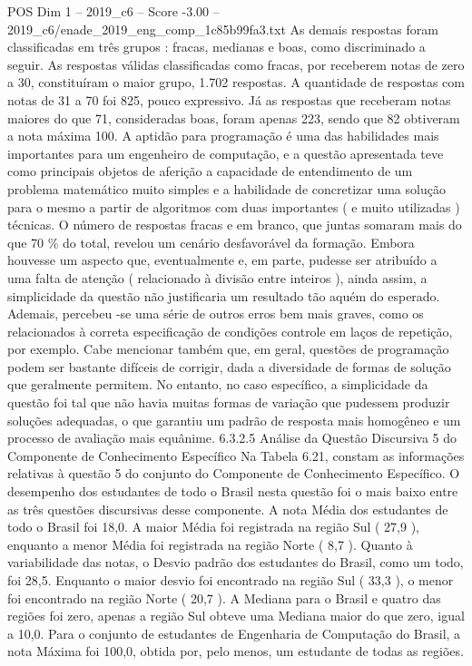 \begin{textsample}{POS Dim 1 – 2019\_c6 – Score -3.00 – 2019\_c6/enade\_2019\_eng\_comp\_1c85b99fa3.txt}
As demais respostas foram classificadas em três grupos : fracas, medianas e boas, como discriminado a seguir.
As respostas válidas classificadas como fracas, por receberem notas de zero a 30, constituíram o maior grupo, 1.702 respostas.
A quantidade de respostas com notas de 31 a 70 foi 825, pouco expressivo.
Já as respostas que receberam notas maiores do que 71, consideradas boas, foram apenas 223, sendo que 82 obtiveram a nota máxima 100.
A aptidão para programação é uma das habilidades mais importantes para um engenheiro de computação, e a questão apresentada teve como principais objetos de aferição a capacidade de entendimento de um problema matemático muito simples e a habilidade de concretizar uma solução para o mesmo a partir de algoritmos com duas importantes ( e muito utilizadas ) técnicas.
O número de respostas fracas e em branco, que juntas somaram mais do que 70 \% do total, revelou um cenário desfavorável da formação.
Embora houvesse um aspecto que, eventualmente e, em parte, pudesse ser atribuído a uma falta de atenção ( relacionado à divisão entre inteiros ), ainda assim, a simplicidade da questão não justificaria um resultado tão aquém do esperado.
Ademais, percebeu -se uma série de outros erros bem mais graves, como os relacionados à correta especificação de condições controle em laços de repetição, por exemplo.
Cabe mencionar também que, em geral, questões de programação podem ser bastante difíceis de corrigir, dada a diversidade de formas de solução que geralmente permitem.
No entanto, no caso específico, a simplicidade da questão foi tal que não havia muitas formas de variação que pudessem produzir soluções adequadas, o que garantiu um padrão de resposta mais homogêneo e um processo de avaliação mais equânime. 6.3.2.5 Análise da Questão Discursiva 5 do Componente de Conhecimento Específico Na Tabela 6.21, constam as informações relativas à questão 5 do conjunto do Componente de Conhecimento Específico.
O desempenho dos estudantes de todo o Brasil nesta questão foi o mais baixo entre as três questões discursivas desse componente.
A nota Média dos estudantes de todo o Brasil foi 18,0.
A maior Média foi registrada na região Sul ( 27,9 ), enquanto a menor Média foi registrada na região Norte ( 8,7 ).
Quanto à variabilidade das notas, o Desvio padrão dos estudantes do Brasil, como um todo, foi 28,5.
Enquanto o maior desvio foi encontrado na região Sul ( 33,3 ), o menor foi encontrado na região Norte ( 20,7 ).
A Mediana para o Brasil e quatro das regiões foi zero, apenas a região Sul obteve uma Mediana maior do que zero, igual a 10,0.
Para o conjunto de estudantes de Engenharia de Computação do Brasil, a nota Máxima foi 100,0, obtida por, pelo menos, um estudante de todas as regiões.

\end{textsample}
